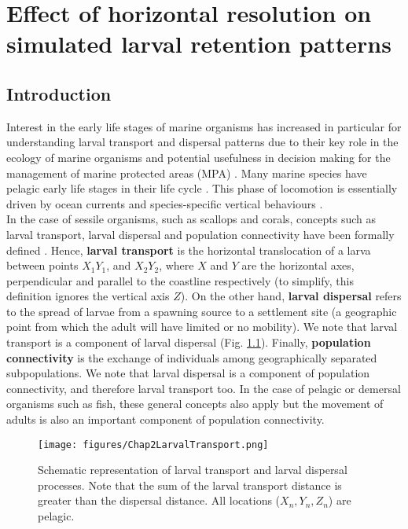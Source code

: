\chapter{Effect of horizontal resolution on simulated larval retention patterns}\label{Chap2}

\section{Introduction}\label{Chap2Intro}

Interest in the early life stages of marine organisms has increased \citep{Stra1993,Haven1995,Levi2006,GawaMoni2007,CoweSpon2009} in particular for understanding larval transport and dispersal patterns \citep{Youn1995,GreeMayp2015,Leis2021} due to their key role in the ecology of marine organisms \citep{MoseSmit1993} and potential usefulness in decision making for the management of marine protected areas (MPA) \citep{DaloBogd2015}. Many marine species have pelagic early life stages in their life cycle \citep{Haven1995}. This phase of locomotion is essentially driven by ocean currents and species-specific vertical behaviours \citep{Levi1990,CowePari2006,DaloBogd2015}.\\

In the case of sessile organisms, such as scallops and corals, concepts such as larval transport, larval dispersal and population connectivity have been formally defined \citep{PineHare2007}. Hence, \textbf{larval transport} is the horizontal translocation of a larva between points $X_{1}Y_{1}$, and $X_{2}Y_{2}$, where $X$ and $Y$ are the horizontal axes, perpendicular and parallel to the coastline respectively (to simplify, this definition ignores the vertical axis $Z$). On the other hand, \textbf{larval dispersal} refers to the spread of larvae from a spawning source to a settlement site (a geographic point from which the adult will have limited or no mobility). We note that larval transport is a component of larval dispersal (Fig. \ref{Chap2LarvalTransport}). Finally, \textbf{population connectivity} is the exchange of individuals among geographically separated subpopulations. We note that larval dispersal is a component of population connectivity, and therefore larval transport too. In the case of pelagic or demersal organisms such as fish, these general concepts also apply but the movement of adults is also an important component of population connectivity.\\

\begin{figure}[ht]
	\texttt{[image: figures/Chap2LarvalTransport.png]}
	\centering
	\caption{Schematic representation of larval transport and larval dispersal processes. Note that the sum of the larval transport distance is greater than the dispersal distance. All locations ($X_{n},Y_{n},Z_{n}$) are pelagic.}
	\label{Chap2LarvalTransport}
\end{figure}

